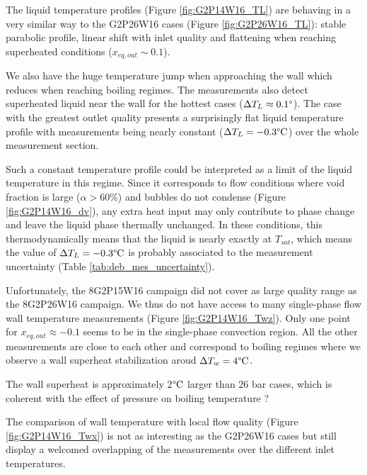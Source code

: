 \npar

The liquid temperature profiles (Figure \ref{fig:G2P14W16_TL}) are behaving in a very similar way to the G2P26W16 cases (Figure \ref{fig:G2P26W16_TL}): stable parabolic profile, linear shift with inlet quality and flattening when reaching superheated conditions ($x_{eq,out} \sim 0.1$).

We also have the huge temperature jump when approaching the wall which reduces when reaching boiling regimes. The measurements also detect superheated liquid near the wall for the hottest cases ($\Delta T_{L} \approx 0.1 \degree$). The case with the greatest outlet quality presents a surprisingly flat liquid temperature profile with measurements being nearly constant ($\Delta T_{L}=-0.3\degree\mathrm{C}$) over the whole measurement section. 

\begin{remark*}{}
Such a constant temperature profile could be interpreted as a limit of the liquid temperature in this regime. Since it corresponds to flow conditions where void fraction is large ($\alpha > 60\%$) and bubbles do not condense (Figure \ref{fig:G2P14W16_dv}), any extra heat input may only contribute to phase change and leave the liquid phase thermally unchanged. In these conditions, this thermodynamically means that the liquid is nearly exactly at $T_{sat}$, which means the value of $\Delta T_{L}=-0.3\degree\mathrm{C}$ is probably associated to the measurement uncertainty (Table \ref{tab:deb_mes_uncertainty}).
\end{remark*}

\npar

Unfortunately, the 8G2P15W16 campaign did not cover as large quality range as the 8G2P26W16 campaign. We thus do not have access to many single-phase flow wall temperature measurements (Figure \ref{fig:G2P14W16_Twz}). Only one point for $x_{eq,out} \approx -0.1$ seems to be in the single-phase convection region. All the other measurements are close to each other and correspond to boiling regimes where we observe a wall superheat stabilization aroud $\Delta T_{w} = 4\degree\mathrm{C}$.

\begin{note*}{}
The wall superheat is approximately 2$\degree\mathrm{C}$ larger than 26 bar cases, which is coherent with the effect of pressure on boiling temperature \cite{hibiki_active_2003, kossolapov_experimental_2021}?
\end{note*} 

The comparison of wall temperature with local flow quality (Figure \ref{fig:G2P14W16_Twx}) is not as interesting as the G2P26W16 cases but still display a welcomed overlapping of the measurements over the different inlet temperatures.


